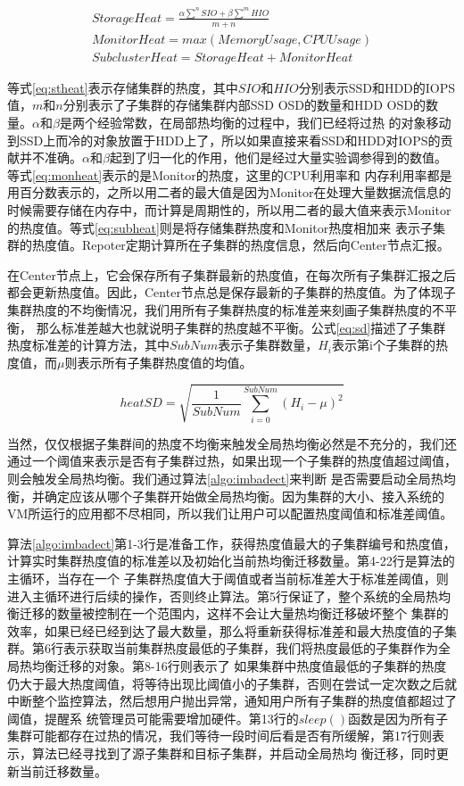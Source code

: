 \begin{eqnarray}
    \displaystyle  StorageHeat = \frac{\alpha \sum^n SIO + \beta \sum^m HIO}{m+n} \label{eq:stheat}\\
    \displaystyle  MonitorHeat = max(MemoryUsage, CPUUsage) \label{eq:monheat}  \\
    \displaystyle  SubclusterHeat = StorageHeat + MonitorHeat
    \label{eq:subheat}
    \end{eqnarray}

等式\ref{eq:stheat}表示存储集群的热度，其中$SIO$和$HIO$分别表示SSD和HDD的IOPS值，$m$和$n$分别表示了子集群的存储集群内部SSD OSD的数量和HDD OSD的数量。$\alpha$和$\beta$是两个经验常数，在局部热均衡的过程中，我们已经将过热
的对象移动到SSD上而冷的对象放置于HDD上了，所以如果直接来看SSD和HDD对IOPS的贡献并不准确。$\alpha$和$\beta$起到了归一化的作用，他们是经过大量实验调参得到的数值。等式\ref{eq:monheat}表示的是Monitor的热度，这里的CPU利用率和
内存利用率都是用百分数表示的，之所以用二者的最大值是因为Monitor在处理大量数据流信息的时候需要存储在内存中，而计算是周期性的，所以用二者的最大值来表示Monitor的热度值。等式\ref{eq:subheat}则是将存储集群热度和Monitor热度相加来
表示子集群的热度值。Repoter定期计算所在子集群的热度信息，然后向Center节点汇报。

在Center节点上，它会保存所有子集群最新的热度值，在每次所有子集群汇报之后都会更新热度值。因此，Center节点总是保存最新的子集群的热度值。为了体现子集群热度的不均衡情况，我们用所有子集群热度的标准差来刻画子集群热度的不平衡，
那么标准差越大也就说明子集群的热度越不平衡。公式\ref{eq:sd}描述了子集群热度标准差的计算方法，其中$SubNum$表示子集群数量，$H_i$表示第i个子集群的热度值，而$\mu$则表示所有子集群热度值的均值。

\begin{equation}
    \label{eq:sd}
    heatSD = \sqrt{\frac{1}{SubNum} \sum_{i=0}^{SubNum} (H_i - \mu)^2}
\end{equation}

当然，仅仅根据子集群间的热度不均衡来触发全局热均衡必然是不充分的，我们还通过一个阈值来表示是否有子集群过热，如果出现一个子集群的热度值超过阈值，则会触发全局热均衡。我们通过算法\ref{algo:imbadect}来判断
是否需要启动全局热均衡，并确定应该从哪个子集群开始做全局热均衡。因为集群的大小、接入系统的VM所运行的应用都不尽相同，所以我们让用户可以配置热度阈值和标准差阈值。

算法\ref{algo:imbadect}第1-3行是准备工作，获得热度值最大的子集群编号和热度值，计算实时集群热度值的标准差以及初始化当前热均衡迁移数量。第4-22行是算法的主循环，当存在一个
子集群热度值大于阈值或者当前标准差大于标准差阈值，则进入主循环进行后续的操作，否则终止算法。第5行保证了，整个系统的全局热均衡迁移的数量被控制在一个范围内，这样不会让大量热均衡迁移破坏整个
集群的效率，如果已经已经到达了最大数量，那么将重新获得标准差和最大热度值的子集群。第6行表示获取当前集群热度最低的子集群，我们将热度最低的子集群作为全局热均衡迁移的对象。第8-16行则表示了
如果集群中热度值最低的子集群的热度仍大于最大热度阈值，将等待出现比阈值小的子集群，否则在尝试一定次数之后就中断整个监控算法，然后想用户抛出异常，通知用户所有子集群的热度值都超过了阈值，提醒系
统管理员可能需要增加硬件。第13行的$sleep()$函数是因为所有子集群可能都存在过热的情况，我们等待一段时间后看是否有所缓解，第17行则表示，算法已经寻找到了源子集群和目标子集群，并启动全局热均
衡迁移，同时更新当前迁移数量。

